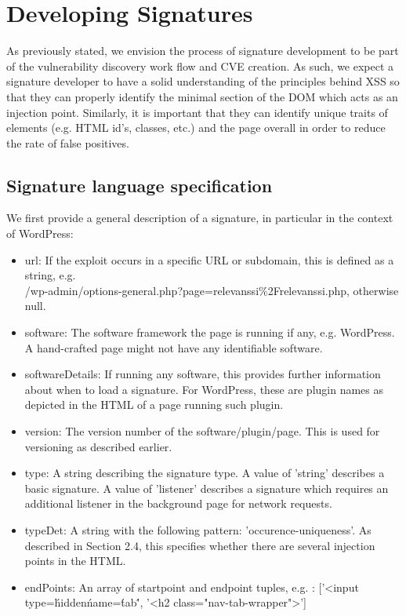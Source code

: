 \section{Developing Signatures}

As previously stated, we envision the process of signature development to be part of the vulnerability discovery work flow and CVE creation. As such, we expect a signature developer to have a solid understanding of the principles behind XSS so that they can properly identify the minimal section of the DOM which acts as an injection point. Similarly, it is important that they can identify unique traits of elements (e.g. HTML id's, classes, etc.) and the page overall in order to reduce the rate of false positives.

\subsection{Signature language specification} 

We first provide a general description of a signature, in particular in the context of WordPress:
\begin{itemize}
	\item
	url: If the exploit occurs in a specific URL or subdomain, this is defined as a string, e.g.
	\\ /wp-admin/options-general.php?page=relevanssi\%2Frelevanssi.php, otherwise null.
	\item
	software: The software framework the page is running if any, e.g. WordPress. A hand-crafted page
	might not have any identifiable software.
	\item
	softwareDetails: If running any software, this provides further information about when to load a signature. For WordPress, these are plugin names as depicted in the HTML of a page running such plugin.
	\item
	version: The version number of the software/plugin/page. This is used for versioning as described earlier.
	\item 
	type: A string describing the signature type. A value of 'string' describes a basic signature. A value of 'listener' describes a signature which requires an additional listener in the background page for network requests.
	\item
	typeDet: A string with the following pattern: 'occurence-uniqueness'. As described in Section 2.4, this specifies whether there are several injection points in the HTML.
	\item
	endPoints: An array of startpoint and endpoint tuples, e.g. : ['<input type=\'hidden\' name=\'tab\'', '<h2 class="nav-tab-wrapper">']
\end{itemize}

